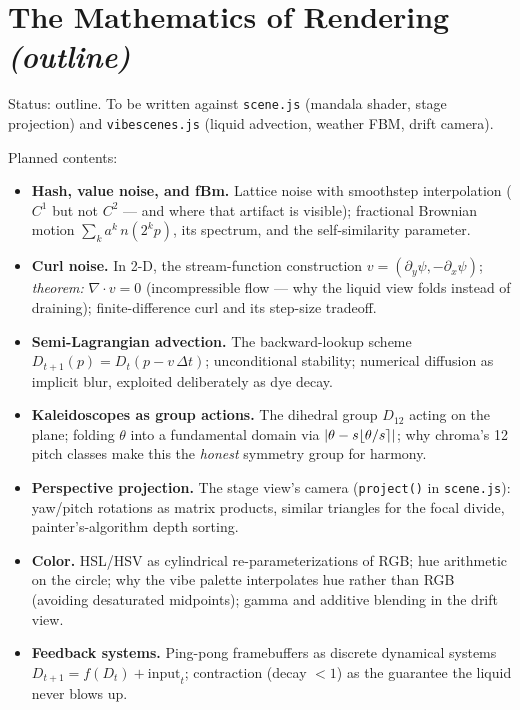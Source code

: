 \chapter{The Mathematics of Rendering \emph{(outline)}}\label{ch:shaders}

\begin{incode}
Status: outline. To be written against \texttt{scene.js} (mandala shader,
stage projection) and \texttt{vibescenes.js} (liquid advection, weather FBM,
drift camera).
\end{incode}

Planned contents:
\begin{itemize}
  \item \textbf{Hash, value noise, and fBm.} Lattice noise with smoothstep
  interpolation ($C^1$ but not $C^2$ --- and where that artifact is visible);
  fractional Brownian motion $\sum_k a^k\, n(2^k p)$, its spectrum, and the
  self-similarity parameter.
  \item \textbf{Curl noise.} In 2-D, the stream-function construction
  $v = (\partial_y \psi, -\partial_x \psi)$; \emph{theorem:}
  $\nabla \cdot v = 0$ (incompressible flow --- why the liquid view folds
  instead of draining); finite-difference curl and its step-size tradeoff.
  \item \textbf{Semi-Lagrangian advection.} The backward-lookup scheme
  $D_{t+1}(p) = D_t(p - v\,\Delta t)$; unconditional stability; numerical
  diffusion as implicit blur, exploited deliberately as dye decay.
  \item \textbf{Kaleidoscopes as group actions.} The dihedral group
  $D_{12}$ acting on the plane; folding $\theta$ into a fundamental domain
  via $\lvert\theta - s\lfloor \theta/s \rceil\rvert$; why chroma's 12 pitch
  classes make this the \emph{honest} symmetry group for harmony.
  \item \textbf{Perspective projection.} The stage view's camera
  (\texttt{project()} in \texttt{scene.js}): yaw/pitch rotations as matrix
  products, similar triangles for the focal divide, painter's-algorithm
  depth sorting.
  \item \textbf{Color.} HSL/HSV as cylindrical re-parameterizations of RGB;
  hue arithmetic on the circle; why the vibe palette interpolates hue rather
  than RGB (avoiding desaturated midpoints); gamma and additive blending in
  the drift view.
  \item \textbf{Feedback systems.} Ping-pong framebuffers as discrete
  dynamical systems $D_{t+1} = f(D_t) + \text{input}_t$; contraction (decay
  $< 1$) as the guarantee the liquid never blows up.
\end{itemize}
